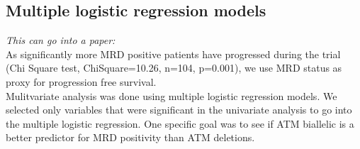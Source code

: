 \documentclass[a4paper,11pt]{article}
\begin{document}
\subsection{Multiple logistic regression models}

\emph{This can go into a paper:}\\
As significantly more MRD positive patients have progressed during the trial (Chi Square test, ChiSquare=10.26, n=104, p=0.001), we use MRD status as proxy for progression free survival.\\
Mulitvariate analysis was done using multiple logistic regression models. We selected only variables that were significant in the univariate analysis to go into the multiple logistic regression. One specific goal was to see if ATM biallelic is a better predictor for MRD positivity than ATM deletions.
\end{document}
